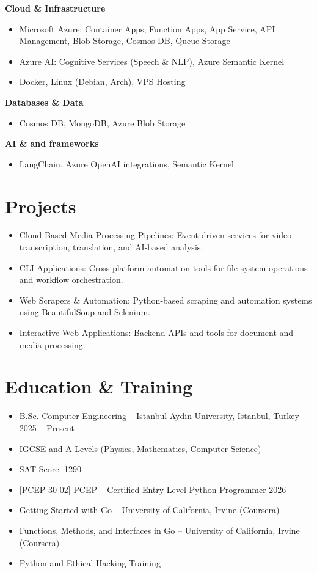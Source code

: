 \documentclass[11pt,a4paper]{article}
\begin{document}
\textbf{Cloud \& Infrastructure}
\begin{itemize}[leftmargin=*]
    \item Microsoft Azure: Container Apps, Function Apps, App Service, API Management, Blob Storage, Cosmos DB, Queue Storage
    \item Azure AI: Cognitive Services (Speech \& NLP), Azure Semantic Kernel
    \item Docker, Linux (Debian, Arch), VPS Hosting
\end{itemize}

\textbf{Databases \& Data}
\begin{itemize}[leftmargin=*]
    \item Cosmos DB, MongoDB, Azure Blob Storage
\end{itemize}

\textbf{AI \& and frameworks}
\begin{itemize}[leftmargin=*]
    \item LangChain, Azure OpenAI integrations, Semantic Kernel
\end{itemize}

\section*{Projects}
\begin{itemize}[leftmargin=*]
    \item Cloud-Based Media Processing Pipelines: Event-driven services for video transcription, translation, and AI-based analysis.
    \item CLI Applications: Cross-platform automation tools for file system operations and workflow orchestration.
    \item Web Scrapers \& Automation: Python-based scraping and automation systems using BeautifulSoup and Selenium.
    \item Interactive Web Applications: Backend APIs and tools for document and media processing.
\end{itemize}

\section*{Education \& Training}
\begin{itemize}[leftmargin=*]
    \item B.Sc. Computer Engineering -- Istanbul Aydin University, Istanbul, Turkey \hfill 2025 -- Present
    \item IGCSE and A-Levels (Physics, Mathematics, Computer Science)
    \item SAT Score: 1290
    \item {[PCEP-30-02] PCEP\texttrademark{} -- Certified Entry-Level Python Programmer \hfill 2026}
    \item Getting Started with Go – University of California, Irvine (Coursera)
    \item Functions, Methods, and Interfaces in Go – University of California, Irvine (Coursera)
    \item Python and Ethical Hacking Training
\end{itemize}
\end{document}
